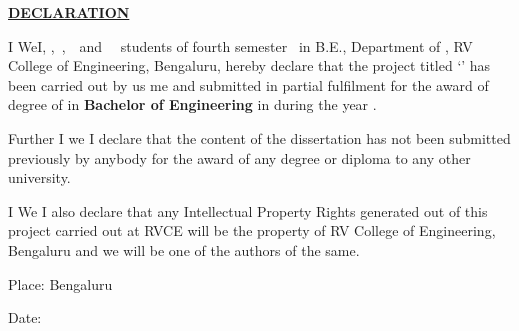 
\thispagestyle{empty}

\begin{center}
\Large\textbf{\underline{DECLARATION}} \par
\end{center}


\noindent \ifPG I \else \ifStuNameBUsed We\else I\fi\fi, \textbf{\printStuNameA} \ifPG \else\ifStuNameBUsed  \ifStuNameCUsed ,$\,$ \fi \textbf{\printStuNameB} \ifStuNameCUsed  \ifStuNameDUsed ,$\,$ \fi \textbf{\printStuNameC}$\,$ \ifStuNameDUsed and $\,$ \textbf{\printStuNameD}$\,$ \fi \fi \fi \fi students of \ifPG fourth \else {}\fi \fi semester \ifPG \printMastersInSF\, in \printMastersPrgName \else B.E.\fi, Department of \printDepartmentLF, RV College of Engineering, Bengaluru, hereby declare that the \fi project titled `\textbf{\printTitle}' has been carried out by \ifStuNameBUsed us \else me \fi and submitted in partial fulfilment for the award of degree of \ifPG \textbf{\printMastersInLF} in \textbf{\printMastersPrgName} \else\textbf{Bachelor of Engineering} in \textbf{\printDepartmentLF} \fi during the year \printAcadYear.\\ \par

\noindent Further \ifPG I \else\ifStuNameBUsed we \else I \fi \fi declare that the content of the dissertation has not been submitted previously by anybody for the award of any degree or diploma to any other university.\\ \par

\noindent \ifPG I \else\ifStuNameBUsed We \else I \fi \fi also declare that any Intellectual Property Rights generated out of this project carried out at RVCE will be the property of RV College of Engineering, Bengaluru and we will be one of the authors of the same.

\vspace{1cm}
\noindent Place: Bengaluru\par
\vspace{0.5cm}
\noindent Date: \par

